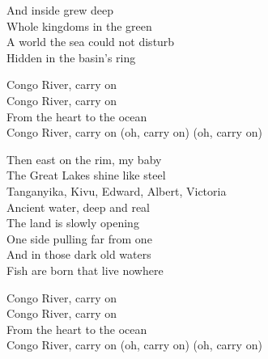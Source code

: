 \begin{lyrics}
And inside grew deep\\
Whole kingdoms in the green\\
A world the sea could not disturb\\
Hidden in the basin's ring

Congo River, carry on\\
Congo River, carry on\\
From the heart to the ocean\\
Congo River, carry on
(oh, carry on)
(oh, carry on)

Then east on the rim, my baby\\
The Great Lakes shine like steel\\
Tanganyika, Kivu, Edward, Albert, Victoria\\
Ancient water, deep and real\\
The land is slowly opening\\
One side pulling far from one\\
And in those dark old waters\\
Fish are born that live nowhere

Congo River, carry on\\
Congo River, carry on\\
From the heart to the ocean\\
Congo River, carry on
(oh, carry on)
(oh, carry on)
\end{lyrics}

